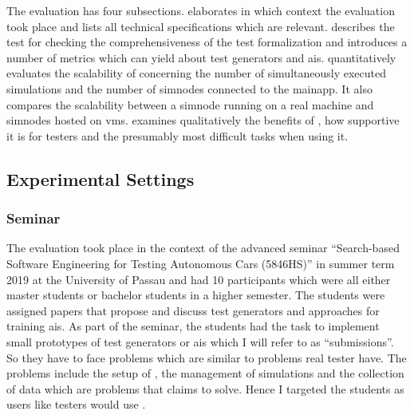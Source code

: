 The evaluation has four subsections.
 elaborates in which context the evaluation took place and lists all technical specifications which are relevant.
 describes the test for checking the comprehensiveness of the test formalization and introduces a number of metrics which \drivebuild{} can yield about test generators and \glspl{ai}.
 quantitatively evaluates the scalability of \drivebuild{} concerning the number of simultaneously executed simulations and the number of \glspl{simnode} connected to the \gls{mainapp}.
It also compares the scalability between a \gls{simnode} running on a real machine and \glspl{simnode} hosted on \glspl{vm}.
 examines qualitatively the benefits of \drivebuild{}, how supportive it is for testers and the presumably most difficult tasks when using it.
\subsection{Experimental Settings}\label{subsec:experimentalSettings}
\subsubsection{Seminar}
The evaluation took place in the context of the advanced seminar \enquote{Search-based Software Engineering for Testing Autonomous Cars (5846HS)} in summer term 2019 at the University of Passau and had 10 participants which were all either master students or bachelor students in a higher semester.
The students were assigned papers that propose and discuss test generators and approaches for training \glspl{ai}.
As part of the seminar, the students had the task to implement small prototypes of test generators or \glspl{ai} which I will refer to as \enquote{submissions}.
So they have to face problems which are similar to problems real tester have.
The problems include the setup of \beamng{}, the management of simulations and the collection of data which are problems that \drivebuild{} claims to solve.
Hence I targeted the students as users like testers would use \drivebuild{}.
